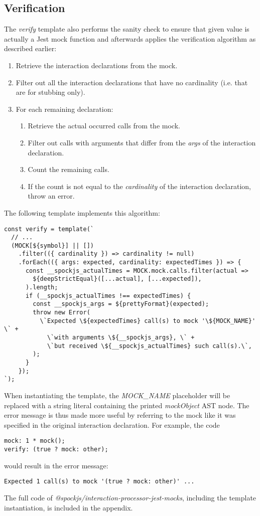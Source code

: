 \subsection{Verification}
The \textit{verify} template also performs the sanity check
to ensure that given value is actually a Jest mock function
and afterwards applies the verification algorithm as described earlier:
\begin{enumerate}
  \item Retrieve the interaction declarations from the mock.
  \item Filter out all the interaction declarations that have no cardinality
    (i.e. that are for stubbing only).
  \item For each remaining declaration:
    \begin{enumerate}
      \item Retrieve the actual occurred calls from the mock.
      \item Filter out calls with arguments that differ from
        the \textit{args} of the interaction declaration.
      \item Count the remaining calls.
      \item If the count is not equal to
        the \textit{cardinality} of the interaction declaration,
        throw an error.
    \end{enumerate}
\end{enumerate}

The following template implements this algorithm:
\begin{verbatim}
const verify = template(`
  // ...
  (MOCK[${symbol}] || [])
    .filter(({ cardinality }) => cardinality != null)
    .forEach(({ args: expected, cardinality: expectedTimes }) => {
      const __spockjs_actualTimes = MOCK.mock.calls.filter(actual =>
        ${deepStrictEqual}([...actual], [...expected]),
      ).length;
      if (__spockjs_actualTimes !== expectedTimes) {
        const __spockjs_args = ${prettyFormat}(expected);
        throw new Error(
          \`Expected \${expectedTimes} call(s) to mock '\${MOCK_NAME}' \` +
            \`with arguments \${__spockjs_args}, \` +
            \`but received \${__spockjs_actualTimes} such call(s).\`,
        );
      }
    });
`);
\end{verbatim}

When instantiating the template,
the \textit{MOCK\_NAME} placeholder
will be replaced with a string literal
containing the printed
\textit{mockObject} AST node.
The error message is thus made more useful
by referring to the mock like it was specified
in the original interaction declaration.
For example, the code
\begin{verbatim}
mock: 1 * mock();
verify: (true ? mock: other);
\end{verbatim}
would result in the error message:
\begin{verbatim}
Expected 1 call(s) to mock '(true ? mock: other)' ...
\end{verbatim}

The full code of \textit{@spockjs/interaction-processor-jest-mocks},
including the template instantiation,
is included in the appendix.
